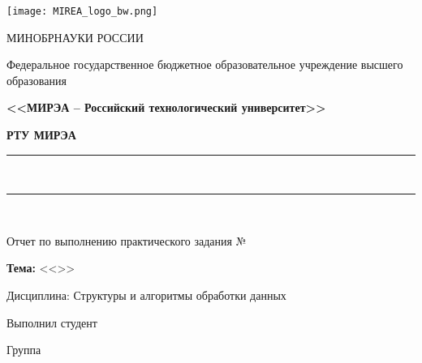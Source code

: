 
\begin{titlepage}
	\begin{center}
		\texttt{[image: MIREA\_logo\_bw.png]}
		
		\hfill \break
		{\small МИНОБРНАУКИ РОССИИ}
		
		Федеральное государственное бюджетное образовательное учреждение высшего образования
		
		\textbf{<<МИРЭА – Российский технологический университет>>}
		
		\textbf{РТУ МИРЭА}
		
		\rule{\linewidth}{0.5pt} \\ [-0.65cm]
		\rule{\linewidth}{0.5pt} \\ [+0.35cm]
						
		\vspace{3cm}
		
		\makeatletter		
		\ifdefined\@worknum
		Отчет по выполнению практического задания №\@worknum
		\fi		

		\ifdefined\@topic						
		\textbf{Тема:} <<\@topic>>
		\fi
		
		\hfill \break
		Дисциплина: Структуры и алгоритмы обработки данных
		
		\vfill
		
		\ifdefined\@author
		Выполнил студент \hfill \@author \\
		\fi
		
		\ifdefined\@group
		Группа \hfill \@group 
		\fi
		
		\makeatother
		
		\vspace{4cm}
		
		\thispagestyle{titlepagefooter}
	\end{center}
	\clearpage
\end{titlepage}
